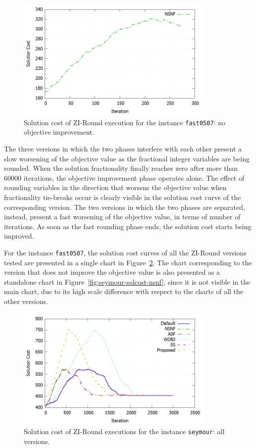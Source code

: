 \documentclass[a4paper,12pt]{book}
\begin{document}
\begin{figure}[ht]
	\centering
	\includegraphics[width=0.85\textwidth]{fast0507-solcost-nsnf.png}
	\caption{Solution cost of ZI-Round execution for the instance \texttt{fast0507}: no objective improvement.}
	\label{fig:fast0507-solcost-nsnf}
\end{figure}
The three versions in which the two phases interfere with each other present a slow worsening of the objective value as the fractional integer variables are being rounded. When the solution fractionality finally reaches zero after more than $60000$ iterations, the objective improvement phase operates alone. 
The effect of rounding variables in the direction that worsens the objective value when fractionality tie-breaks occur is clearly visible in the solution cost curve of the corresponding version.
The two versions in which the two phases are separated, instead, present a fast worsening of the objective value, in terms of number of iterations. As soon as the fast rounding phase ends, the solution cost starts being improved. \par

For the instance \texttt{fast0507}, the solution cost curves of all the ZI-Round versions tested are presented in a single chart in Figure~\ref{fig:seymour-solcost-all}. The chart corresponding to the version that does not improve the objective value is also presented as a standalone chart in Figure~\ref{fig:seymour-solcost-nsnf}, since it is not visible in the main chart, due to its high scale difference with respect to the charts of all the other versions.
\begin{figure}[ht]
	\centering
	\includegraphics[width=0.85\textwidth]{seymour-solcost-all.png}
	\caption{Solution cost of ZI-Round executions for the instance \texttt{seymour}: all versions.}
	\label{fig:seymour-solcost-all}
\end{figure}
\end{document}

